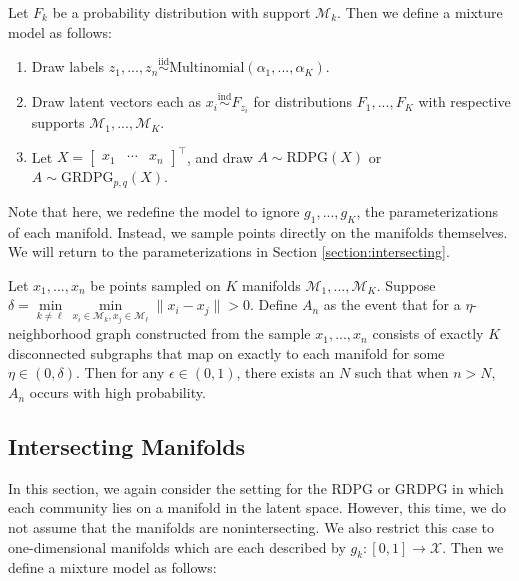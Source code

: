 \documentclass[12pt]{article}
\providecommand{\tightlist}{%
  \setlength{\itemsep}{0pt}\setlength{\parskip}{0pt}}
\begin{document}
Let \(F_k\) be a probability distribution with support
\(\mathcal{M}_k\). Then we define a mixture model as follows:

\begin{enumerate}
\def\labelenumi{\arabic{enumi}.}
\tightlist
\item
  Draw labels
  \(z_1, ..., z_n \stackrel{\mathrm{iid}}{\sim}\mathrm{Multinomial}(\alpha_1, ..., \alpha_K)\).
\item
  Draw latent vectors each as
  \(x_i \stackrel{\mathrm{ind}}{\sim}F_{z_i}\) for distributions
  \(F_1, ..., F_K\) with respective supports
  \(\mathcal{M}_1, ..., \mathcal{M}_K\).
\item
  Let \(X = \begin{bmatrix} x_1 & \cdots & x_n \end{bmatrix}^\top\), and
  draw \(A \sim \mathrm{RDPG}(X)\) or
  \(A \sim \mathrm{GRDPG}_{p,q}(X)\).
\end{enumerate}

Note that here, we redefine the model to ignore \(g_1, ..., g_K\), the
parameterizations of each manifold. Instead, we sample points directly
on the manifolds themselves. We will return to the parameterizations in
Section \ref{section:intersecting}.

\begin{theorem}
\label{nonintersect-no-noise}
Let $x_1, ..., x_n$ be points sampled on $K$ manifolds $\mathcal{M}_1, ..., \mathcal{M}_K$. 
Suppose $\delta = \min\limits_{k \neq \ell} \min\limits_{x_i \in \mathcal{M}_k, x_j \in \mathcal{M}_\ell} \| x_i - x_j \| > 0$. 
Define $A_n$ as the event that for a $\eta$-neighborhood graph constructed from the sample $x_1, ..., x_n$ consists of exactly $K$ disconnected subgraphs that map on exactly to each manifold for some $\eta \in (0, \delta)$. 
Then for any $\epsilon \in (0, 1)$, there exists an $N$ such that when $n > N$, $A_n$ occurs with high probability. 
\label{nonintersect-no-noise}
\end{theorem}

\hypertarget{intersecting-manifolds}{%
\subsection{Intersecting Manifolds}\label{intersecting-manifolds}}

\label{section:intersecting}

In this section, we again consider the setting for the RDPG or GRDPG in
which each community lies on a manifold in the latent space. However,
this time, we do not assume that the manifolds are nonintersecting. We
also restrict this case to one-dimensional manifolds which are each
described by \(g_k : [0, 1] \to \mathcal{X}\). Then we define a mixture
model as follows:
\end{document}
